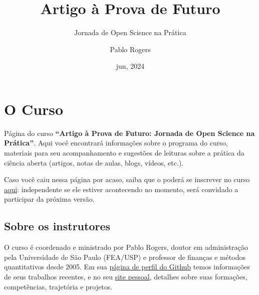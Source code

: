 \documentclass[
  a4paper,
]{book}
\title{Artigo à Prova de Futuro}
\subtitle{Jornada de Open Science na Prática}
\author{Pablo Rogers}
\date{jun, 2024}
\let\oldmaketitle\maketitle
\renewcommand*\contentsname{Índice}
\newcommand\contentsname{Índice}
\begin{document}
\frontmatter
\maketitle

\begin{center}

\end{center}
\let\maketitle\oldmaketitle
\maketitle
\AtBeginShipoutNext{\AtBeginShipoutDiscard}
\mainmatter

\renewcommand*\contentsname{Índice}
{
\hypersetup{linkcolor=}
\setcounter{tocdepth}{2}
\tableofcontents
}
\mainmatter
{}

\chapter*{O Curso 🏢}\label{sec-home}


Página do curso \textbf{``Artigo à Prova de Futuro: Jornada de Open
Science na Prática''}. Aqui você encontrará informações sobre o programa
do curso, materiais para seu acompanhamento e sugestões de leituras
sobre a prática da ciência aberta (artigos, notas de aulas, blogs,
vídeos, etc.).

Caso você caiu nessa página por acaso, saiba que o poderá se inscrever
no curso \href{https://forms.gle/b6Zio7oL8XxxhhtS9}{aqui}: independente
se ele estiver acontecendo no momento, será convidado a participar da
próxima versão.

\section*{Sobre os instrutores}\label{sec-instrutor}


O curso é coordenado e ministrado por Pablo Rogers, doutor em
administração pela Universidade de São Paulo (FEA/USP) e professor de
finanças e métodos quantitativos desde 2005. Em sua
\href{https://github.com/phdpablo}{página de perfil do Github} temos
informações de seus trabalhos recentes, e no seu
\href{https://phdpablo.com/}{site pessoal}, detalhes sobre suas
formações, competências, trajetória e projetos.
\end{document}
